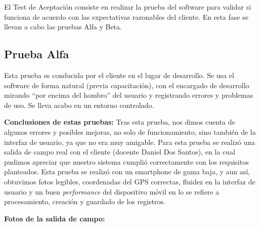 		El Test de Aceptación consiste en realizar la prueba del software para validar si funciona de acuerdo con las expectativas razonables del cliente. En esta fase se llevan a cabo las pruebas Alfa y Beta.

	\subsection{Prueba Alfa}

		Esta prueba es conducida por el cliente en el lugar de desarrollo. Se usa el software de forma natural (previa capacitación), con el encargado de desarrollo mirando “por encima del hombro” del usuario y registrando errores y problemas de uso. Se lleva acabo en un entorno controlado.

		\textbf{Conclusiones de estas pruebas:}
		Tras esta prueba, nos dimos cuenta de algunos errores y posibles mejoras, no solo de funcionamiento, sino también de la interfaz de usuario, ya que no era muy amigable. 
		Para esta prueba se realizó una salida de campo real con el cliente (docente Daniel Dos Santos), en la cual pudimos apreciar que nuestro sistema cumplió correctamente con los requisitos planteados.
		Esta prueba se realizó con un smartphone de gama baja, y aun así, obtuvimos fotos legibles, coordenadas del GPS correctas, fluidez en la interfaz de usuario y un buen \textit{performance} del dispositivo móvil en lo se refiere a procesamiento, creación y guardado de los registros.
		\newpage 

		\textbf{Fotos de la salida de campo:}

